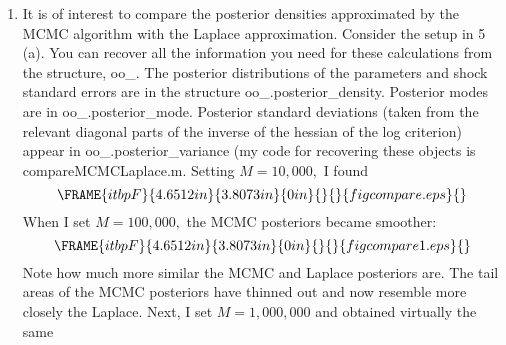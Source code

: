 \documentclass[12pt,thmsa]{article}
\begin{document}
\begin{enumerate}
\item It is of interest to compare the posterior densities approximated by
the MCMC algorithm with the Laplace approximation. Consider the setup in 5
(a). You can recover all the information you need for these calculations
from the structure, oo\_. The posterior distributions of the parameters and
shock standard errors are in the structure oo\_.posterior\_density.
Posterior modes are in oo\_.posterior\_mode. Posterior standard deviations
(taken from the relevant diagonal parts of the inverse of the hessian of the
log criterion) appear in oo\_.posterior\_variance (my code for recovering
these objects is compareMCMCLaplace.m. Setting $M=10,000,$ I found%
\begin{equation*}
\end{equation*}%
\begin{equation*}
\end{equation*}%
\begin{equation*}
\FRAME{itbpF}{4.6512in}{3.8073in}{0in}{}{}{figcompare.eps}{\special{language
"Scientific Word";type "GRAPHIC";maintain-aspect-ratio TRUE;display
"USEDEF";valid_file "F";width 4.6512in;height 3.8073in;depth
0in;original-width 6.0848in;original-height 4.9741in;cropleft "0";croptop
"1";cropright "1";cropbottom "0";filename 'figcompare.eps';file-properties
"XNPEU";}}
\end{equation*}%
\begin{equation*}
\end{equation*}%
When I set $M=100,000,$ the MCMC posteriors became smoother:%
\begin{equation*}
\end{equation*}%
\begin{equation*}
\end{equation*}%
\begin{equation*}
\FRAME{itbpF}{4.6512in}{3.8073in}{0in}{}{}{figcompare1.eps}{\special%
{language "Scientific Word";type "GRAPHIC";maintain-aspect-ratio
TRUE;display "USEDEF";valid_file "F";width 4.6512in;height 3.8073in;depth
0in;original-width 6.0848in;original-height 4.9741in;cropleft "0";croptop
"1";cropright "1";cropbottom "0";filename 'figcompare1.eps';file-properties
"XNPEU";}}
\end{equation*}%
\begin{equation*}
\end{equation*}%
Note how much more similar the MCMC and Laplace posteriors are. The tail
areas of the MCMC posteriors have thinned out and now resemble more closely
the Laplace. Next, I set $M=1,000,000$ and obtained virtually the same

\end{enumerate}
\end{document}
